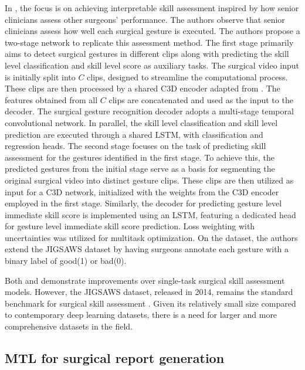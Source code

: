 \documentclass[times,twocolumn,final]{elsarticle}
\renewcommand{\cite}[1]{\citep{#1}}
\begin{document}
In \citet{accurate_skill_assessment_gesture}, the focus is on achieving interpretable skill assessment inspired by how senior clinicians assess other surgeons' performance. The authors observe that senior clinicians assess how well each surgical gesture is executed. The authors propose a two-stage network to replicate this assessment method.
The first stage primarily aims to detect surgical gestures in different clips along with predicting the skill level classification and skill level score as auxiliary tasks. The surgical video input is initially split into $C$ clips, designed to streamline the computational process. These clips are then processed by a shared C3D encoder adapted from \citet{tran2015learning}. The features obtained from all $C$ clips are concatenated and used as the input to the decoder.
The surgical gesture recognition decoder adopts a multi-stage temporal convolutional network. In parallel, the skill level classification and skill level prediction are executed through a shared LSTM, with classification and regression heads.
The second stage focuses on the task of predicting skill assessment for the gestures identified in the first stage. To achieve this, the predicted gestures from the initial stage serve as a basis for segmenting the original surgical video into distinct gesture clips. These clips are then utilized as input for a C3D network, initialized with the weights from the C3D encoder employed in the first stage. Similarly, the decoder for predicting gesture level immediate skill score is implemented using an LSTM, featuring a dedicated head for gesture level immediate skill score prediction. Loss weighting with uncertainties \citet{uncertainty_weighting} was utilized for multitask optimization. On the dataset, the authors extend the JIGSAWS dataset by having surgeons annotate each gesture with a binary label of good(1) or bad(0). 

Both \citet{accurate_skill_assessment_gesture} and \citet{jian2020multitask} demonstrate improvements over single-task surgical skill assessment models. However, the JIGSAWS dataset, released in 2014, remains the standard benchmark for surgical skill assessment \cite{lam2022machine}. Given its relatively small size compared to contemporary deep learning datasets, there is a need for larger and more comprehensive datasets in the field.

\subsection{MTL for surgical report generation} \label{sec::report_generation}
\end{document}
